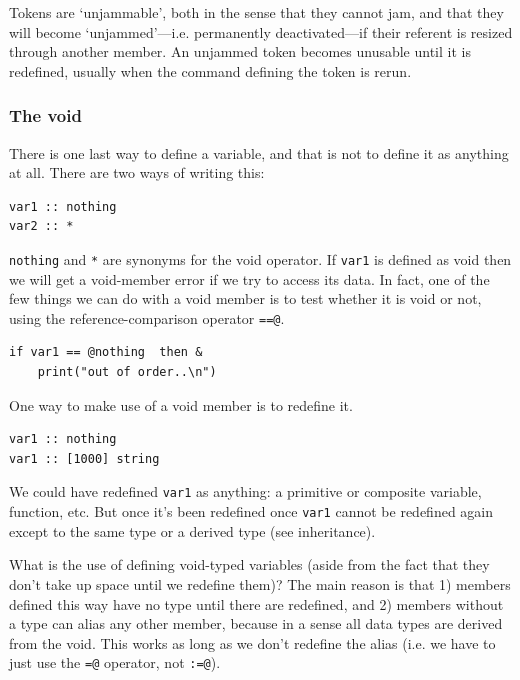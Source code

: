\documentclass{article}
\newenvironment{code}{
       \begin{list}{}{
               \setlength{\leftmargin}{.4in}
               \setlength{\rightmargin}{0in}
               \setlength{\topsep}{.2in}
       }
       \small
       \item[] }
       { \end{list}   }
\begin{document}
\noindent Tokens are `unjammable', both in the sense that they cannot jam, and that they will become `unjammed'---i.e. permanently deactivated---if their referent is resized through another member.  An unjammed token becomes unusable until it is redefined, usually when the command defining the token is rerun.





\subsubsection{The void}

There is one last way to define a variable, and that is not to define it as anything at all.  There are two ways of writing this:

\begin{code} \begin{verbatim}
var1 :: nothing
var2 :: *
\end{verbatim} \end{code}

\noindent \verb#nothing# and \verb#*# are synonyms for the void operator.  If \verb#var1# is defined as void then we will get a void-member error if we try to access its data.  In fact, one of the few things we can do with a void member is to test whether it is void or not, using the reference-comparison operator \verb#==@#.

\begin{code} \begin{verbatim}
if var1 == @nothing  then &
    print("out of order..\n")
\end{verbatim} \end{code}

One way to make use of a void member is to redefine it.

\begin{code} \begin{verbatim}
var1 :: nothing
var1 :: [1000] string
\end{verbatim} \end{code}

\noindent We could have redefined \verb#var1# as anything:  a primitive or composite variable, function, etc.  But once it's been redefined once \verb#var1# cannot be redefined again except to the same type or a derived type (see inheritance).

What is the use of defining void-typed variables (aside from the fact that they don't take up space until we redefine them)?  The main reason is that 1) members defined this way have no type until there are redefined, and 2) members without a type can alias any other member, because in a sense all data types are derived from the void.  This works as long as we don't redefine the alias (i.e. we have to just use the \verb#=@# operator, not \verb#:=@#).
\end{document}
